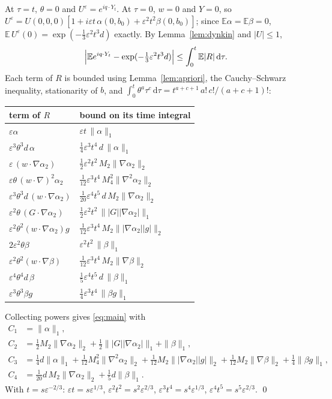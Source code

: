 \documentclass[11pt]{article}
\newcommand{\dd}{\mathrm{d}}
\newcommand{\E}{\mathbb{E}}
\newcommand{\eps}{\varepsilon}
\newcommand{\nrm}[2]{\|#1\|_{#2}}
\theoremstyle{remark}
\begin{document}
At $\tau=t$, $\theta=0$ and $U^\eps = e^{iq\cdot Y_t}$. At $\tau=0$, $w=0$ and
$Y=0$, so $U^\eps = U(0,0,0)[1 + i\eps t\,\alpha(0,b_0) + \eps^2t^2\beta(0,b_0)]$;
since $\E\alpha = \E\beta = 0$,
$\E\,U^\eps(0) = \exp(-\tfrac13\eps^2t^3d)$ exactly. By Lemma~\ref{lem:dynkin}
and $|U|\le1$,
\[
  \Bigl|\E e^{iq\cdot Y_t} - \exp(-\tfrac13\eps^2t^3d)\Bigr|
  \le \int_0^t\E|R|\,\dd\tau .
\]
Each term of $R$ is bounded using Lemma~\ref{lem:apriori}, the
Cauchy--Schwarz inequality, stationarity of $b$, and
$\int_0^t\theta^a\tau^c\,\dd\tau = t^{a+c+1}\,a!\,c!/(a+c+1)!$:
\begin{center}
\renewcommand{\arraystretch}{1.3}
\begin{tabular}{ll}
  term of $R$ & bound on its time integral \\ \hline
  $\eps\alpha$ & $\eps t\,\nrm{\alpha}{1}$ \\
  $\eps^3\theta^3d\,\alpha$ & $\tfrac14\eps^3t^4\,d\,\nrm{\alpha}{1}$ \\
  $\eps\,(w\cdot\nabla\alpha_2)$ & $\tfrac12\eps^2t^2\,M_2\nrm{\nabla\alpha_2}{2}$ \\
  $\eps\theta\,(w\cdot\nabla)^2\alpha_2$ & $\tfrac1{12}\eps^3t^4\,M_4^2\nrm{\nabla^2\alpha_2}{2}$ \\
  $\eps^3\theta^3d\,(w\cdot\nabla\alpha_2)$ & $\tfrac1{20}\eps^4t^5\,d\,M_2\nrm{\nabla\alpha_2}{2}$ \\
  $\eps^2\theta\,(G\cdot\nabla\alpha_2)$ & $\tfrac12\eps^2t^2\,\nrm{|G||\nabla\alpha_2|}{1}$ \\
  $\eps^2\theta^2(w\cdot\nabla\alpha_2)g$ & $\tfrac1{12}\eps^3t^4\,M_2\nrm{|\nabla\alpha_2||g|}{2}$ \\
  $2\eps^2\theta\beta$ & $\eps^2t^2\,\nrm{\beta}{1}$ \\
  $\eps^2\theta^2(w\cdot\nabla\beta)$ & $\tfrac1{12}\eps^3t^4\,M_2\nrm{\nabla\beta}{2}$ \\
  $\eps^4\theta^4d\,\beta$ & $\tfrac15\eps^4t^5\,d\,\nrm{\beta}{1}$ \\
  $\eps^3\theta^3\beta g$ & $\tfrac14\eps^3t^4\,\nrm{\beta g}{1}$ \\
\end{tabular}
\end{center}
Collecting powers gives \eqref{eq:main} with
\begin{equation}
\begin{aligned}
  C_1 &= \nrm{\alpha}{1}, \\
  C_2 &= \tfrac12M_2\nrm{\nabla\alpha_2}{2}
        + \tfrac12\nrm{|G||\nabla\alpha_2|}{1} + \nrm{\beta}{1}, \\
  C_3 &= \tfrac14d\nrm{\alpha}{1} + \tfrac1{12}M_4^2\nrm{\nabla^2\alpha_2}{2}
        + \tfrac1{12}M_2\nrm{|\nabla\alpha_2||g|}{2}
        + \tfrac1{12}M_2\nrm{\nabla\beta}{2} + \tfrac14\nrm{\beta g}{1}, \\
  C_4 &= \tfrac1{20}d\,M_2\nrm{\nabla\alpha_2}{2} + \tfrac15d\nrm{\beta}{1}.
\end{aligned}
\label{eq:consts}
\end{equation}
With $t = s\eps^{-2/3}$: $\eps t = s\eps^{1/3}$,
$\eps^2t^2 = s^2\eps^{2/3}$, $\eps^3t^4 = s^4\eps^{1/3}$,
$\eps^4t^5 = s^5\eps^{2/3}$. \qed
\end{document}

